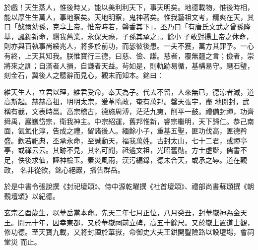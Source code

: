 \begin{pinyinscope}
 於戲！天生蒸人，惟後時乂，能以美利利天下，事天明矣。地德載物，惟後時相，能以厚生生萬人，事地察矣。天地明察，鬼神著矣。惟我藝祖文考，精爽在天，其曰「懿爾幼孫，克享上帝。惟帝時若，馨香其下」，丕乃曰「有唐氏文武之曾孫隆基，誕錫新命，纘我舊業，永保天祿，子孫其承之」。餘小
 子敢對揚上帝之休命，則亦與百執事尚綏兆人，將多於前功，而毖彼後患。一夫不獲，萬方其罪予。一心有終，上天其知我。朕惟寶行三德，曰慈、儉、謙。慈者，覆無疆之言；儉者，崇將來之訓；自滿者人損，自謙者天益。茍如是，則軌跡易循，基構易守。磨石璧，刻金石，冀後人之聽辭而見心，觀末而知本。銘曰：



 維天生人，立君以理，維君受命，奉天為子。代去不留，人來無已，德涼者滅，道高斯起。赫赫高祖，明明太宗，爰革隋政，奄有萬邦。罄天張宇，盡
 地開封，武稱有截，文表時邕。高宗稽古，德施周溥，茫茫九夷，削平一鼓。禮備封禪，功齊舜禹，巖巍岱宗，衛我神主。中宗紹運，舊邦惟新，睿宗繼明，天下歸仁。恭己南面，氤氳化淳，告成之禮，留諸後人。緬餘小子，重基五聖，匪功伐高，匪德矜盛。欽若祀典，丕承永命，至誠動天，福我萬姓。古封太山，七十二君，或禪亭亭，或禪云云。其跡不見，其名可聞，祗遹文祖，光昭舊勛。方士虛誕，儒書不足，佚後求仙，誣神檢玉。秦災風雨，漢污編錄，德未合天，或承之辱。道在觀政，
 名非從欲，銘心絕巖，播告群岳。



 於是中書令張說撰《封祀壇頌》、侍中源乾曜撰《社首壇頌》、禮部尚書蘇頲撰《朝覲壇頌》以紀德。



 玄宗乙酉歲生，以華岳當本命。先天二年七月正位，八月癸丑，封華嶽神為金天王。開元十年，因幸東都，又於華嶽祠前立碑，高五十餘尺。又於嶽上置道士觀，修功德。至天寶九載，又將封禪於華嶽，命御史大夫王鉷開鑿險路以設壇場，會祠堂災
 而止。



\end{pinyinscope}